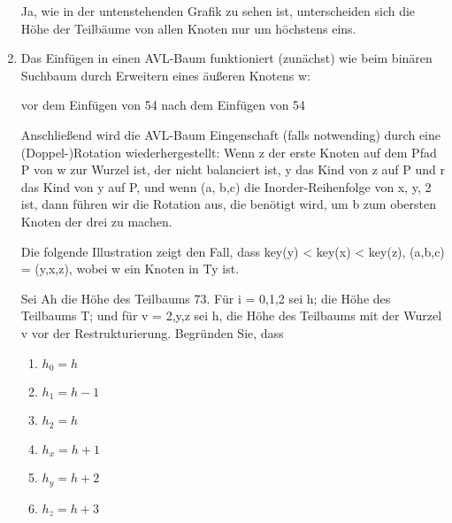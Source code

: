 \documentclass{bschlangaul-aufgabe}
\begin{document}
\begin{enumerate}
\begin{bAntwort}
Ja, wie in der untenstehenden Grafik zu sehen ist, unterscheiden sich
die Höhe der Teilbäume von allen Knoten nur um höchstens eins.


\end{bAntwort}

\item Das Einfügen in einen AVL-Baum funktioniert (zunächst) wie beim binären
Suchbaum durch Erweitern eines äußeren Knotens w:

vor dem Einfügen von 54 nach dem Einfügen von 54

Anschließend wird die AVL-Baum Eingenschaft (falls notwending) durch eine
(Doppel-)Rotation wiederhergestellt: Wenn z der erste Knoten auf dem Pfad P von w zur
Wurzel ist, der nicht balanciert ist, y das Kind von z auf P und r das Kind von y auf P,
und wenn (a, b,c) die Inorder-Reihenfolge von x, y, 2 ist, dann führen wir die Rotation aus,
die benötigt wird, um b zum obersten Knoten der drei zu machen.

Die folgende Illustration zeigt den Fall, dass key(y) < key(x) < key(z), \dh
(a,b,c) = (y,x,z), wobei w ein Knoten in Ty ist.

Sei Ah die Höhe des Teilbaums 73. Für i = 0,1,2 sei h; die Höhe des Teilbaums T; und
für v = 2,y,z sei h, die Höhe des Teilbaums mit der Wurzel v vor der Restrukturierung.
Begründen Sie, dass

\begin{enumerate}

\item $h_0 = h$

\item $h_1 = h - 1$

\item  $h_2 = h$

\item $h_x = h + 1$

\item $h_y = h + 2$

\item  $h_z = h + 3$
\end{enumerate}


\end{enumerate}
\end{document}
